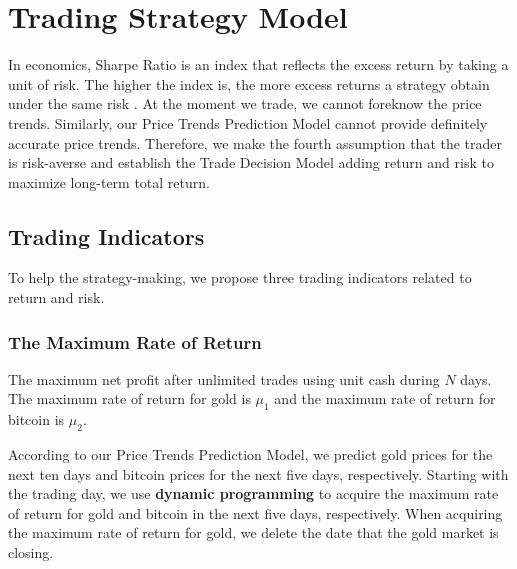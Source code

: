 \documentclass[12pt]{article}
\begin{document}
\section{Trading Strategy Model}
In economics, Sharpe Ratio is an index that reflects the excess return by taking a unit of risk. The higher the index is, the more excess returns a strategy obtain under the same risk \cite{12}. At the moment we trade, we cannot foreknow the price trends. Similarly, our Price Trends Prediction Model cannot provide definitely accurate price trends. Therefore, we make the fourth assumption that the trader is risk-averse and establish the Trade Decision Model adding return and risk to maximize long-term total return.
\subsection{Trading Indicators}
To help the strategy-making, we propose three trading indicators related to return and risk.
\subsubsection{The Maximum Rate of Return}
The maximum net profit after unlimited trades using unit cash during $N$ days. The maximum rate of return for gold is $\mu_1$ and the maximum rate of return for bitcoin is $\mu_2$.

According to our Price Trends Prediction Model, we predict gold prices for the next ten days and bitcoin prices for the next five days, respectively. Starting with the trading day, we use \textbf{dynamic programming} to acquire the maximum rate of return for gold and bitcoin in the next five days, respectively. When acquiring the maximum rate of return for gold, we delete the date that the gold market is closing. 
\end{document}
